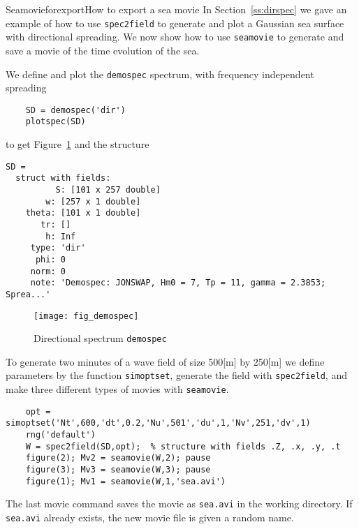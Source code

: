 \begin{rtex}{Seamovieforexport}{How to export a sea movie}
In Section~\ref{ss:dirspec} we gave an example of how to use {\tt spec2field} 
to generate and plot a Gaussian sea surface with directional spreading. We now show how to 
use {\tt seamovie} to generate and save a movie of the time evolution of the sea. 

We define and plot the {\tt demospec} spectrum, with frequency independent 
spreading 
{\small\begin{verbatim}
    SD = demospec('dir')
    plotspec(SD)
\end{verbatim}}
\noindent to get Figure~\ref{fig:demospec} and the structure
{\small\begin{verbatim}
SD = 
  struct with fields:
          S: [101 x 257 double]
        w: [257 x 1 double]
    theta: [101 x 1 double]
       tr: []
        h: Inf
     type: 'dir'
      phi: 0
     norm: 0
     note: 'Demospec: JONSWAP, Hm0 = 7, Tp = 11, gamma = 2.3853; Sprea...'
\end{verbatim}
}

\begin{figure}[t]
\centerline{\texttt{[image: fig\_demospec]}}
\caption[Directional spectrum {\tt demospec}]{Directional spectrum {\tt demospec}}
\label{fig:demospec}
\end{figure}

To generate two minutes of a wave field of size 500[m] by 250[m] we define parameters 
by the function 
{\tt simoptset}, 
generate the field with 
{\tt spec2field}, 
and make three different types of movies with {\tt seamovie}.  
{\small\begin{verbatim}
    opt = simoptset('Nt',600,'dt',0.2,'Nu',501','du',1,'Nv',251,'dv',1)
    rng('default')
    W = spec2field(SD,opt);  % structure with fields .Z, .x, .y, .t
    figure(2); Mv2 = seamovie(W,2); pause
    figure(3); Mv3 = seamovie(W,3); pause
    figure(1); Mv1 = seamovie(W,1,'sea.avi')
 \end{verbatim}}
\noindent The last movie command saves the movie as {\tt sea.avi} in the working directory. 
If {\tt sea.avi} already exists, the new movie file is given a random name. 
\end{rtex}

